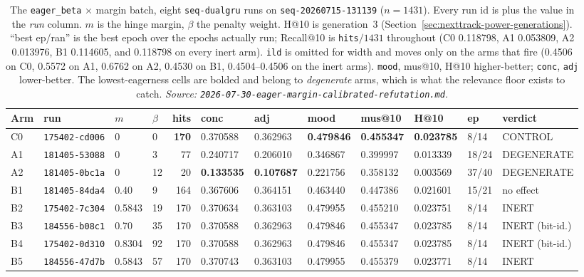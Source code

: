 \documentclass[11pt]{article}
\newcommand{\runid}[1]{\texttt{\small\seqsplit{#1}}}
\newcommand{\dsid}[1]{\texttt{\small #1}}
\newcommand{\best}[1]{\textbf{#1}}
\begin{document}
\begin{table}[ht]
  \centering
  \caption{The \texttt{eager\_beta} $\times$ margin batch, eight
  \texttt{seq-dualgru} runs on \dsid{seq-20260715-131139} ($n=\num{1431}$). Every
  run id is \protect\runid{run-20260730-} plus the value in the \emph{run} column.
  $m$ is the hinge margin, $\beta$ the penalty weight. H@10 is generation~3
  (Section~\ref{sec:nexttrack-power-generations}). ``best ep/ran'' is the best epoch over
  the epochs actually run; Recall@10 is \texttt{hits}$/\num{1431}$ throughout
  (C0 \num{0.118798}, A1 \num{0.053809}, A2 \num{0.013976}, B1 \num{0.114605}, and
  \num{0.118798} on every inert arm). \texttt{ild} is omitted for width and moves
  only on the arms that fire (\num{0.4506} on C0, \num{0.5572} on A1, \num{0.6762}
  on A2, \num{0.4530} on B1, \numrange{0.4504}{0.4506} on the inert arms).
  \texttt{mood}, mus@10, H@10 higher-better; \texttt{conc}, \texttt{adj}
  lower-better. The lowest-eagerness
  cells are bolded and belong to \emph{degenerate} arms, which is what the
  relevance floor exists to catch.
  \emph{Source: \texttt{2026-07-30-eager-margin-calibrated-refutation.md}.}}
  \label{tab:nexttrack-eagermargin}
  {\scriptsize\setlength{\tabcolsep}{2.8pt}\begin{tabular}{llllrlllllll}
    \toprule
    Arm & run & $m$ & $\beta$ & hits & conc & adj & mood & mus@10 & H@10 & ep & verdict \\
    \midrule
    C0 & \texttt{175402-cd006} & 0 & 0 & \best{170} & 0.370588 & 0.362963 & \best{0.479846} & \best{0.455347} & \best{0.023785} & 8/14 & CONTROL \\
    A1 & \texttt{181405-53088} & 0 & 3 & 77 & 0.240717 & 0.206010 & 0.346867 & 0.399997 & 0.013339 & 18/24 & DEGENERATE \\
    A2 & \texttt{181405-0bc1a} & 0 & 12 & 20 & \best{0.133535} & \best{0.107687} & 0.221756 & 0.358132 & 0.003569 & 37/40 & DEGENERATE \\
    B1 & \texttt{181405-84da4} & 0.40 & 9 & 164 & 0.367606 & 0.364151 & 0.463440 & 0.447386 & 0.021601 & 15/21 & no effect \\
    B2 & \texttt{175402-7c304} & 0.5843 & 19 & 170 & 0.370634 & 0.363103 & 0.479955 & 0.455210 & 0.023751 & 8/14 & INERT \\
    B3 & \texttt{184556-b08c1} & 0.70 & 35 & 170 & 0.370588 & 0.362963 & 0.479846 & 0.455347 & 0.023785 & 8/14 & INERT (bit-id.) \\
    B4 & \texttt{175402-0d310} & 0.8304 & 92 & 170 & 0.370588 & 0.362963 & 0.479846 & 0.455347 & 0.023785 & 8/14 & INERT (bit-id.) \\
    B5 & \texttt{184556-47d7b} & 0.5843 & 57 & 170 & 0.370743 & 0.363103 & 0.479955 & 0.455379 & 0.023771 & 8/14 & INERT \\
    \bottomrule
  \end{tabular}}
\end{table}
\end{document}
